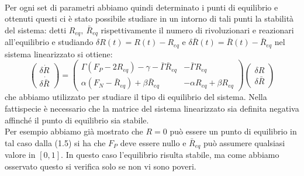 \\
Per ogni set di parametri abbiamo quindi determinato i punti di equilibrio e ottenuti questi ci è stato possibile studiare in un intorno di tali punti la stabilità del sistema: detti $R_{eq},\ \bar{R}_{eq}$ rispettivamente il numero di rivoluzionari e reazionari all'equilibrio e studiando $\delta R(t)=R(t)- R_{eq}$ e $\delta \bar{R}(t)=\bar{R}(t)-\bar R_{eq}$ nel sistema linearizzato si ottiene:
\begin{equation}
	\begin{pmatrix}
		\delta \dot{R}\\ 
		\delta \dot{\bar{R}}
	\end{pmatrix}
	=\begin{pmatrix}
		\Gamma(F_P-2R_{eq})-\gamma-\bar{\Gamma} \bar{R}_{eq} & -\bar{\Gamma}R_{eq}\\
		\alpha(F_{N}-\bar{R}_{eq})+\beta \bar{R}_{eq} & -\alpha R_{eq}+\beta R_{eq}
	\end{pmatrix}
	\begin{pmatrix}
		\delta R\\
		\delta \bar{R}
	\end{pmatrix}
\end{equation} 
che abbiamo utilizzato per studiare il tipo di equilibrio del sistema. Nella fattispecie è necessario che la matrice del sistema linearizzato sia definita negativa affinché il punto di equilibrio sia stabile.\\
Per esempio abbiamo già mostrato che $R=0$ può essere un punto di equilibrio in tal caso dalla (1.5) si ha che $F_P$ deve essere nullo e $\bar R_{eq}$ può assumere qualsiasi valore in $[0,1]$. In questo caso l'equilibrio risulta stabile, ma come abbiamo osservato questo si verifica solo se non vi sono poveri.\\
